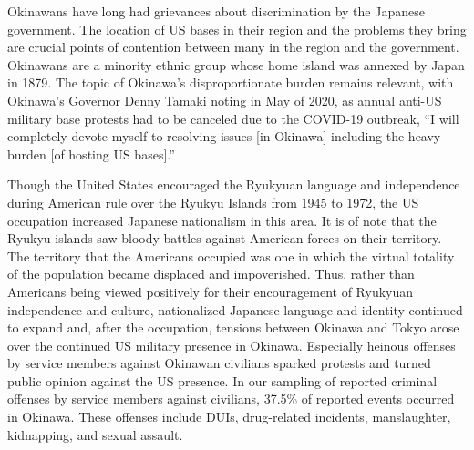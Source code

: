 Okinawans have long had grievances about discrimination by the Japanese government. The location of US bases in their region and the problems they bring are crucial points of contention between many in the region and the government. Okinawans are a minority ethnic group whose home island was annexed by Japan in 1879.\cite[Though suppressed by the Japanese, the Ryukyuan languages (one of which is Okinawan) are distinct from Japanese, and those looking to preserve Okinawan identity are engaging in concerted efforts to teach the languages to the new generations to prevent their extinction.][]{Heinrich2004,Fifield2014,UNESCO2010} The topic of Okinawa's disproportionate burden remains relevant, with Okinawa's Governor Denny Tamaki noting in May of 2020, as annual anti-US military base protests had to be canceled due to the COVID-19 outbreak, ``I will completely devote myself to resolving issues [in Okinawa] including the heavy burden [of hosting US bases].''\cite{JPTimes2020}

Though the United States encouraged the Ryukyuan language and independence during American rule over the Ryukyu Islands from 1945 to 1972, the US occupation increased Japanese nationalism in this area. It is of note that the Ryukyu islands saw bloody battles against American forces on their territory.\cite{tokyoone20200427} The territory that the Americans occupied was one in which the virtual totality of the population became displaced and impoverished.\cite{Heinrich2004} Thus, rather than Americans being viewed positively for their encouragement of Ryukyuan independence and culture, nationalized Japanese language and identity continued to expand and, after the occupation, tensions between Okinawa and Tokyo arose over the continued US military presence in Okinawa. Especially heinous offenses by service members against Okinawan civilians sparked protests and turned public opinion against the US presence. In our sampling of reported criminal offenses by service members against civilians, 37.5\% of reported events occurred in Okinawa. These offenses include DUIs, drug-related incidents, manslaughter, kidnapping, and sexual assault.

